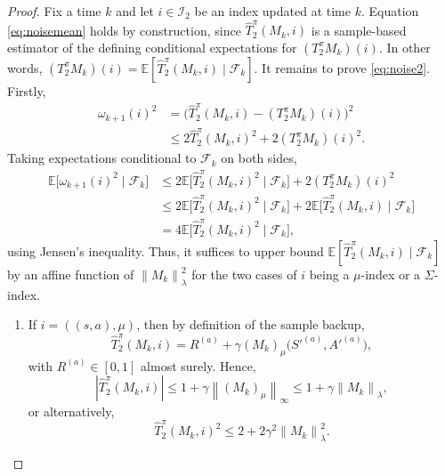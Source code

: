 \documentclass[accepted]{uai2026}
\theoremstyle{plain}
\theoremstyle{definition}
\theoremstyle{remark}
\newcommand{\E}{\mathbb{E}}
\newcommand{\Lvert}{\left\lvert}
\newcommand{\Rvert}{\right\rvert}
\newcommand{\LVert}{\left\lVert}
\newcommand{\RVert}{\right\rVert}
\newcommand{\1}{\mathbbm{1}}
\newcommand{\norm}[1]{\left\lVert #1\right\rVert}
\begin{document}
\begin{proof}
Fix a time $k$ and let $i \in \mathcal{I}_2$ be an index updated at time $k$. Equation \eqref{eq:noisemean} holds by construction, since $\hat{T}^\pi_2(M_k, i)$ is a sample-based estimator of the defining conditional expectations for $(T^\pi_2M
_k)(i)$. In other words, $(T^\pi_2 M_k)(i) = \E[\hat{T}^\pi_2(M_k,i)\mid \mathcal{F}_k]$. It remains to prove \eqref{eq:noise2}. Firstly,
\begin{equation}
\begin{split}
\omega_{k+1}(i)^2 &= \big(\hat{T}^\pi_2(M_k, i) - (T^\pi_2M_k)(i)\big)^2 \\
&\le 2\hat{T}^\pi_2(M_k, i)^2 +2(T^\pi_2M_k)(i)^2.
\end{split}
\end{equation}
Taking expectations conditional to $\mathcal{F}_k$ on both sides,
\begin{equation}\label{eq:4times}
\begin{split}
\E\big[ \omega_{k+1}(i)^2 \mid \mathcal{F}_k\big] &\le 2\E\big[\hat{T}^\pi_2(M_k, i)^2 \mid \mathcal{F}_k\big] + 2(T^\pi_2M_k)(i)^2 \\
&\le 2\E\big[\hat{T}^\pi_2(M_k, i)^2 \mid \mathcal{F}_k\big] + 2\E\big[\hat{T}^\pi_2(M_k, i) \mid \mathcal{F}_k \big] \\
&= 4\E\big[\hat{T}^\pi_2(M_k, i)^2 \mid \mathcal{F}_k\big],
\end{split}
\end{equation}
using Jensen's inequality. Thus, it suffices to upper bound $\E[\hat{T}^\pi_2(M_k, i) \mid \mathcal{F}_k]$ by an affine function of $\norm{M_k}^2_\lambda$ for the two cases of $i$ being a $\mu$-index or a $\Sigma$-index.
\begin{enumerate}[leftmargin=*, itemsep=2pt, align=left]
\item[\textbf{Case 1:}] If $i = ((s, a), \mu)$, then by definition of the sample backup, 
\begin{equation}
\hat{T}^\pi_2(M_k, i) = R^{(a)} + \gamma (M_k)_\mu\big(S'^{(a)}, A'^{(a)}\big),
\end{equation}
with $R^{(a)} \in [0, 1]$ almost surely. Hence,
\begin{equation}
\Lvert \hat{T}^\pi_2(M_k, i)\Rvert \le 1 + \gamma \LVert (M_k)_\mu \RVert_\infty \le 1 + \gamma \LVert M_k \RVert_\lambda,
\end{equation}
or alternatively,
\begin{equation}
\hat{T}^\pi_2(M_k, i)^2 \le 2 + 2 \gamma^2 \LVert M_k\RVert^2_\lambda.
\end{equation}

\end{enumerate}
\end{proof}
\end{document}

